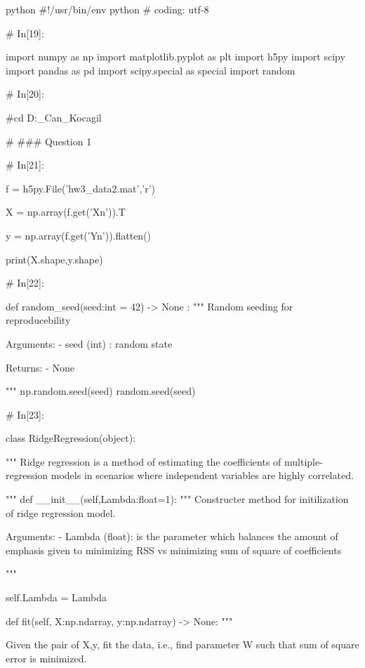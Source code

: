 \documentclass[12pt]{amsart}
\begin{document}
\begin{mintedbox}{python}
#!/usr/bin/env python
# coding: utf-8

# In[19]:


import numpy as np
import matplotlib.pyplot as plt
import h5py
import scipy
import pandas as pd
import scipy.special as special
import random


# In[20]:


#cd D:\ThisSemester\CompNeuro\Homeworks{}_Can_Kocagil\Assignment


# ### Question 1

# In[21]:


f = h5py.File('hw3_data2.mat','r')

X = np.array(f.get('Xn')).T

y = np.array(f.get('Yn')).flatten()
    
print(X.shape,y.shape)


# In[22]:


def random_seed(seed:int = 42) -> None :
    """ Random seeding for reproducebility 
    
            Arguments:
                - seed (int) : random state

            Returns:
                - None
    
    """
    np.random.seed(seed)
    random.seed(seed)


# In[23]:


class RidgeRegression(object):
    
    """
        Ridge regression is a method of estimating the coefficients of multiple-regression models in
        scenarios where independent variables are highly correlated. 

    """
    def __init__(self,Lambda:float=1):
        """
            Constructer method for initilization of ridge regression model.
            
            
                Arguments:
                    - Lambda (float): is the parameter which balances the amount 
                     of emphasis given to minimizing RSS vs minimizing sum of square of coefficients

        
        """

        self.Lambda = Lambda      
     
    def fit(self, X:np.ndarray, y:np.ndarray) -> None:
        """
            
            Given the pair of X,y, fit the data, i.e., find parameter W such that sum of square error
            is minimized. 
            


\end{mintedbox}
\end{document}
